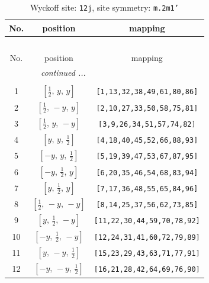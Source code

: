 \documentclass[fleqn,8pt]{jsarticle}
\begin{document}
\begin{longtable}{ccc}
\caption{Wyckoff site: {\tt 12j}, site symmetry: {\tt m.2m1'}}
 \\
 \hline \hline
No. & position & mapping \\ \hline \endfirsthead

\multicolumn{2}{l}{\tablename\ \thetable{}} \\
 \hline \hline
No. & position & mapping \\ \hline \endhead

 \hline \hline
\multicolumn{2}{r}{\footnotesize\it continued ...} \\ \endfoot

 \hline \hline
\multicolumn{2}{r}{} \\ \endlastfoot

1 & $\left[ \frac{1}{2},\, y,\, y \right]$ & {\tt [1,13,32,38,49,61,80,86]} \\ \hline
2 & $\left[ \frac{1}{2},\, - y,\, y \right]$ & {\tt [2,10,27,33,50,58,75,81]} \\ \hline
3 & $\left[ \frac{1}{2},\, y,\, - y \right]$ & {\tt [3,9,26,34,51,57,74,82]} \\ \hline
4 & $\left[ y,\, y,\, \frac{1}{2} \right]$ & {\tt [4,18,40,45,52,66,88,93]} \\ \hline
5 & $\left[ - y,\, y,\, \frac{1}{2} \right]$ & {\tt [5,19,39,47,53,67,87,95]} \\ \hline
6 & $\left[ - y,\, \frac{1}{2},\, y \right]$ & {\tt [6,20,35,46,54,68,83,94]} \\ \hline
7 & $\left[ y,\, \frac{1}{2},\, y \right]$ & {\tt [7,17,36,48,55,65,84,96]} \\ \hline
8 & $\left[ \frac{1}{2},\, - y,\, - y \right]$ & {\tt [8,14,25,37,56,62,73,85]} \\ \hline
9 & $\left[ y,\, \frac{1}{2},\, - y \right]$ & {\tt [11,22,30,44,59,70,78,92]} \\ \hline
10 & $\left[ - y,\, \frac{1}{2},\, - y \right]$ & {\tt [12,24,31,41,60,72,79,89]} \\ \hline
11 & $\left[ y,\, - y,\, \frac{1}{2} \right]$ & {\tt [15,23,29,43,63,71,77,91]} \\ \hline
12 & $\left[ - y,\, - y,\, \frac{1}{2} \right]$ & {\tt [16,21,28,42,64,69,76,90]} \\
\end{longtable}
\renewcommand{\arraystretch}{1.2}
\end{document}
